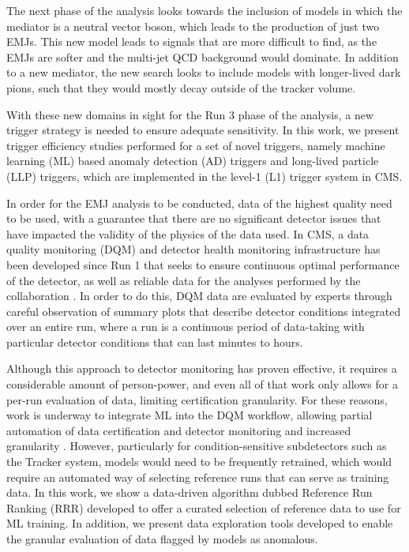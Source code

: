The next phase of the analysis looks towards the inclusion of models in which the mediator is a neutral vector boson, which leads to the production of just two EMJs. This new model leads to signals that are more difficult to find, as the EMJs are softer and the multi-jet QCD background would dominate. In addition to a new mediator, the new search looks to include models with longer-lived dark pions, such that they would mostly decay outside of the tracker volume.

With these new domains in sight for the Run 3 phase of the analysis, a new trigger strategy is needed to ensure adequate sensitivity. In this work, we present trigger efficiency studies performed for a set of novel triggers, namely machine learning (ML) based anomaly detection (AD) triggers and long-lived particle (LLP) triggers, which are implemented in the level-1 (L1) trigger system in CMS.

In order for the EMJ analysis to be conducted, data of the highest quality need to be used, with a guarantee that there are no significant detector issues that have impacted the validity of the physics of the data used. In CMS, a data quality monitoring (DQM) and detector health monitoring infrastructure has been developed since Run 1 that seeks to ensure continuous optimal performance of the detector, as well as reliable data for the analyses performed by the collaboration \cite{DataQualityMonitoring2015, azzoliniDataQualityMonitoring2019}. In order to do this, DQM data are evaluated by experts through careful observation of summary plots that describe detector conditions integrated over an entire run, where a run is a continuous period of data-taking with particular detector conditions that can last minutes to hours.

Although this approach to detector monitoring has proven effective, it requires a considerable amount of person-power, and even all of that work only allows for a per-run evaluation of data, limiting certification granularity. For these reasons, work is underway to integrate ML into the DQM workflow, allowing partial automation of data certification and detector monitoring and increased granularity \cite{wachirapusitanMachineLearningApplications2023, brinkerhoffAnomalyDetectionAutomated2025, CMS-DP-2021-034}. However, particularly for condition-sensitive subdetectors such as the Tracker system, models would need to be frequently retrained, which would require an automated way of selecting reference runs that can serve as training data. In this work, we show a data-driven algorithm dubbed Reference Run Ranking (RRR) developed to offer a curated selection of reference data to use for ML training. In addition, we present data exploration tools developed to enable the granular evaluation of data flagged by models as anomalous. 

